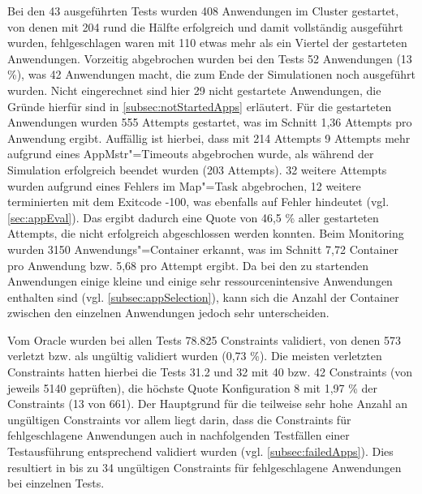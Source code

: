 Bei den 43 ausgeführten Tests wurden 408 Anwendungen im Cluster gestartet, von denen mit 204 rund die Hälfte erfolgreich und damit vollständig ausgeführt wurden, fehlgeschlagen waren mit 110 etwas mehr als ein Viertel der gestarteten Anwendungen.
Vorzeitig abgebrochen wurden bei den Tests 52 Anwendungen (13 \%), was 42 Anwendungen macht, die zum Ende der Simulationen noch ausgeführt wurden.
Nicht eingerechnet sind hier 29 nicht gestartete Anwendungen, die Gründe hierfür sind in \cref{subsec:notStartedApps} erläutert.
Für die gestarteten Anwendungen wurden 555 Attempts gestartet, was im Schnitt 1,36 Attempts pro Anwendung ergibt.
Auffällig ist hierbei, dass mit 214 Attempts 9 Attempts mehr aufgrund eines \gls{AppMstr}"=Timeouts abgebrochen wurde, als während der Simulation erfolgreich beendet wurden (203 Attempts).
32 weitere Attempts wurden aufgrund eines Fehlers im Map"=Task abgebrochen, 12 weitere terminierten mit dem Exitcode -100, was ebenfalls auf Fehler hindeutet (vgl. \cref{sec:appEval}).
Das ergibt dadurch eine Quote von 46,5 \% aller gestarteten Attempts, die nicht erfolgreich abgeschlossen werden konnten.
Beim Monitoring wurden 3150 Anwendungs"=Container erkannt, was im Schnitt 7,72 Container pro Anwendung bzw. 5,68 pro Attempt ergibt.
Da bei den zu startenden Anwendungen einige kleine und einige sehr ressourcenintensive Anwendungen enthalten sind (vgl. \cref{subsec:appSelection}), kann sich die Anzahl der Container zwischen den einzelnen Anwendungen jedoch sehr unterscheiden.

Vom Oracle wurden bei allen Tests 78.825 Constraints validiert, von denen 573 verletzt bzw. als ungültig validiert wurden (0,73 \%).
Die meisten verletzten Constraints hatten hierbei die Tests 31.2 und 32 mit 40 bzw. 42 Constraints (von jeweils 5140 geprüften), die höchste Quote Konfiguration 8 mit 1,97 \% der Constraints (13 von 661).
Der Hauptgrund für die teilweise sehr hohe Anzahl an ungültigen Constraints vor allem liegt darin, dass die Constraints für fehlgeschlagene Anwendungen auch in nachfolgenden Testfällen einer Testausführung entsprechend validiert wurden (vgl. \cref{subsec:failedApps}).
Dies resultiert in bis zu 34 ungültigen Constraints für fehlgeschlagene Anwendungen bei einzelnen Tests.
